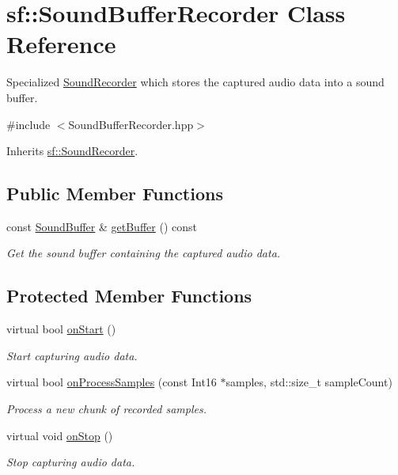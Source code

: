 \hypertarget{classsf_1_1_sound_buffer_recorder}{\section{sf\+:\+:Sound\+Buffer\+Recorder Class Reference}
\label{classsf_1_1_sound_buffer_recorder}
}


Specialized \hyperlink{classsf_1_1_sound_recorder}{Sound\+Recorder} which stores the captured audio data into a sound buffer.  




{\ttfamily \#include $<$Sound\+Buffer\+Recorder.\+hpp$>$}



Inherits \hyperlink{classsf_1_1_sound_recorder}{sf\+::\+Sound\+Recorder}.

\subsection*{Public Member Functions}
\begin{DoxyCompactItemize}
\item 
const \hyperlink{classsf_1_1_sound_buffer}{Sound\+Buffer} \& \hyperlink{classsf_1_1_sound_buffer_recorder_a84fd636ad22f434bafe2a7c15a8e5107}{get\+Buffer} () const 
\begin{DoxyCompactList}\small\item\em Get the sound buffer containing the captured audio data. \end{DoxyCompactList}\end{DoxyCompactItemize}
\subsection*{Protected Member Functions}
\begin{DoxyCompactItemize}
\item 
virtual bool \hyperlink{classsf_1_1_sound_buffer_recorder_a531a7445fc8a48eaf9fc039c83f17c6f}{on\+Start} ()
\begin{DoxyCompactList}\small\item\em Start capturing audio data. \end{DoxyCompactList}\item 
virtual bool \hyperlink{classsf_1_1_sound_buffer_recorder_a9ceb94de14632ae8c1b78faf603b4767}{on\+Process\+Samples} (const Int16 $\ast$samples, std\+::size\+\_\+t sample\+Count)
\begin{DoxyCompactList}\small\item\em Process a new chunk of recorded samples. \end{DoxyCompactList}\item 
\hypertarget{classsf_1_1_sound_buffer_recorder_ab8e53849312413431873a5869d509f1e}{virtual void \hyperlink{classsf_1_1_sound_buffer_recorder_ab8e53849312413431873a5869d509f1e}{on\+Stop} ()}\label{classsf_1_1_sound_buffer_recorder_ab8e53849312413431873a5869d509f1e}

\begin{DoxyCompactList}\small\item\em Stop capturing audio data. \end{DoxyCompactList}\end{DoxyCompactItemize}
